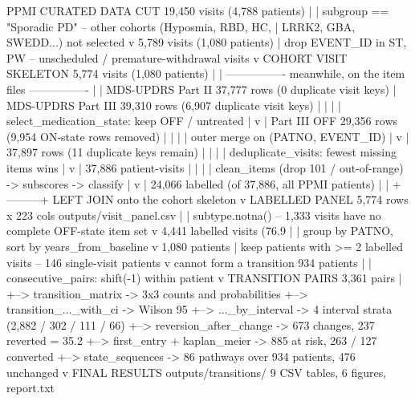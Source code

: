 \documentclass[11pt,a4paper]{article}
\begin{document}
\begin{codeblock}
PPMI CURATED DATA CUT                                        19,450 visits (4,788 patients)
     |
     |  subgroup == "Sporadic PD"        -- other cohorts (Hyposmia, RBD, HC,
     |                                      LRRK2, GBA, SWEDD...) not selected
     v
                                                              5,789 visits (1,080 patients)
     |  drop EVENT_ID in {ST, PW}        -- unscheduled / premature-withdrawal visits
     v
COHORT VISIT SKELETON                                         5,774 visits (1,080 patients)
     |
     |  ---------------- meanwhile, on the item files ----------------
     |
     |   MDS-UPDRS Part II   37,777 rows   (0 duplicate visit keys)
     |   MDS-UPDRS Part III  39,310 rows   (6,907 duplicate visit keys)
     |         |
     |         |  select_medication_state: keep OFF / untreated
     |         v
     |   Part III OFF        29,356 rows   (9,954 ON-state rows removed)
     |         |
     |         |  outer merge on (PATNO, EVENT_ID)
     |         v
     |                       37,897 rows   (11 duplicate keys remain)
     |         |
     |         |  deduplicate_visits: fewest missing items wins
     |         v
     |                       37,886 patient-visits
     |         |
     |         |  clean_items (drop 101 / out-of-range) -> subscores -> classify
     |         v
     |                       24,066 labelled  (of 37,886, all PPMI patients)
     |         |
     +---------+  LEFT JOIN onto the cohort skeleton
     v
LABELLED PANEL                                     5,774 rows x 223 cols
                                                   outputs/visit_panel.csv
     |
     |  subtype.notna()      -- 1,333 visits have no complete OFF-state item set
     v
                                                   4,441 labelled visits (76.9%
     |
     |  group by PATNO, sort by years_from_baseline
     v
                                                   1,080 patients
     |  keep patients with >= 2 labelled visits    -- 146 single-visit patients
     v                                                cannot form a transition
                                                   934 patients
     |
     |  consecutive_pairs: shift(-1) within patient
     v
TRANSITION PAIRS                                   3,361 pairs
     |
     +--> transition_matrix        -> 3x3 counts and probabilities
     +--> transition_..._with_ci   -> Wilson 95%
     +--> ..._by_interval          -> 4 interval strata (2,882 / 302 / 111 / 66)
     +--> reversion_after_change   -> 673 changes, 237 reverted = 35.2%
     +--> first_entry + kaplan_meier -> 885 at risk, 263 / 127 converted
     +--> state_sequences          -> 86 pathways over 934 patients, 476 unchanged
     v
FINAL RESULTS                                      outputs/transitions/
                                                   9 CSV tables, 6 figures, report.txt
\end{codeblock}
\end{document}
